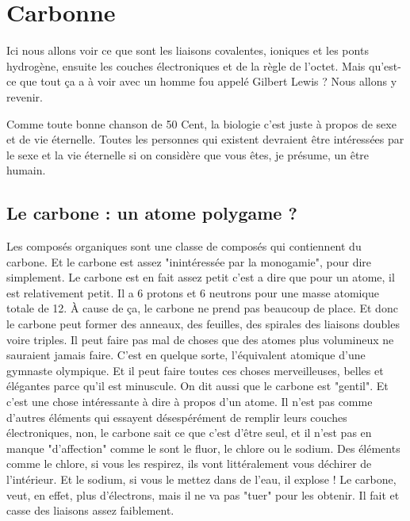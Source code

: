 \hypertarget{carbonne}{%
\chapter{Carbonne}\label{carbonne}}

Ici nous allons voir ce que sont les liaisons covalentes, ioniques et
les ponts hydrogène, ensuite les couches électroniques et de la règle de
l'octet. Mais qu'est-ce que tout ça a à voir avec un homme fou appelé
Gilbert Lewis ? Nous allons y revenir.

Comme toute bonne chanson de 50 Cent, la biologie c'est juste à propos
de sexe et de vie éternelle. Toutes les personnes qui existent devraient
être intéressées par le sexe et la vie éternelle si on considère que
vous êtes, je présume, un être humain.

\hypertarget{le-carbone-un-atome-polygame}{%
\section{Le carbone : un atome polygame
?}\label{le-carbone-un-atome-polygame}}

Les composés organiques sont une classe de composés qui contiennent du
carbone. Et le carbone est assez "inintéressée par la monogamie", pour
dire simplement. Le carbone est en fait assez petit c'est a dire que
pour un atome, il est relativement petit. Il a 6 protons et 6 neutrons
pour une masse atomique totale de 12. À cause de ça, le carbone ne prend
pas beaucoup de place. Et donc le carbone peut former des anneaux, des 
feuilles, des spirales des liaisons doubles voire triples.
Il peut faire pas mal de choses que des atomes plus volumineux ne
sauraient jamais faire. C'est en quelque sorte, l'équivalent atomique
d'une gymnaste olympique. Et il peut faire toutes ces choses
merveilleuses, belles et élégantes parce qu'il est minuscule. On dit
aussi que le carbone est "gentil". Et c'est une chose intéressante à
dire à propos d'un atome. Il n'est pas comme d'autres éléments qui
essayent désespérément de remplir leurs couches électroniques, non, le
carbone sait ce que c'est d'être seul, et il n'est pas en manque
"d'affection" comme le sont le fluor, le chlore ou le sodium. Des éléments
comme le chlore, si vous les respirez, ils vont littéralement vous
déchirer de l'intérieur. Et le sodium, si vous le mettez dans de l'eau,
il explose ! Le carbone, veut, en effet, plus d'électrons, mais il ne va
pas "tuer" pour les obtenir. Il fait et casse des liaisons assez
faiblement.

